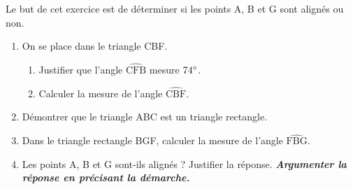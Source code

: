 \documentclass[exercice,a4]{thedocument}%
\begin{document}
\medskip
Le but de cet exercice est de déterminer si les points A, B et G sont alignés ou non.

\begin{enumerate}
\item On se place dans le triangle CBF.
\begin{enumerate}[label=\textbf{\alph*.}]
\item Justifier que l'angle $\widehat{\text{CFB}}$ mesure $74^\circ$.
\item Calculer la mesure de l'angle $\widehat{\text{CBF}}$.
\end{enumerate}
\item Démontrer que le triangle ABC est un triangle rectangle.
\item Dans le triangle rectangle BGF, calculer la mesure de l'angle $\widehat{\text{FBG}}$.
\item Les points A, B et G sont-ils alignés ? Justifier la réponse. \textbf{\textit{Argumenter la réponse en précisant la démarche.}}
\end{enumerate}


\newpage
\medskip
\showthesource
\end{document}

